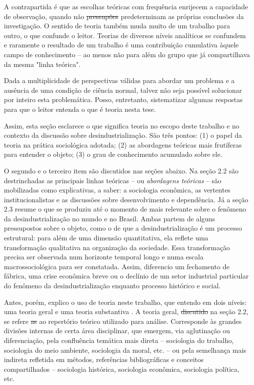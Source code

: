 A contrapartida é que as escolhas teóricas com frequência enrijecem a capacidade
de observação, quando não \sout{pressupões} predeterminam as próprias conclusões da investigação. O sentido de teoria também muda muito de um trabalho para outro, o que confunde o leitor.
Teorias de diversos níveis analíticos
se confundem e raramente o resultado de um trabalho é uma contribuição cumulativa
àquele campo de conhecimento -- ao menos não para além do grupo que já compartilhava da mesma "linha teórica".

Dada a multiplicidade de perspectivas válidas para abordar um problema
e a ausência de uma condição de ciência normal, talvez não seja possível solucionar
por inteiro esta problemática. Posso, entretanto, sistematizar algumas respostas para que o leitor entenda o que é teoria nesta tese.

Assim, esta seção esclarece o que significa teoria no escopo deste trabalho e no contexto da discussão sobre desindustrialização. São três pontos: (1) o papel da teoria na prática sociológica adotada; (2) as abordagens teóricas mais frutíferas para entender o objeto; (3) o grau de conhecimento acumulado sobre ele.

O segundo e o terceiro item são discutidos nas seções abaixo. Na seção 2.2 são
destrinchadas as principais linhas teóricas -- ou \emph{abordagens teóricas} --  são mobilizadas como explicativas, a saber:
a sociologia econômica, as vertentes institucionalistas e as discussões sobre desenvolvimento
e dependência. Já a seção 2.3 resume o que se produziu até o momento de mais relevante
sobre o fenômeno da desindustrialização no mundo e no Brasil. Ambas partem de alguns pressupostos sobre o objeto, como o de que a desindustrialização é um processo estrutural: para além de uma dimensão quantitativa, ela reflete uma transformação qualitativa na organização da sociedade. Essa transformação precisa ser observada num horizonte temporal longo e numa escala macrossociológica para ser constatada. Assim, diferencio um fechamento de fábrica, uma crise econômica breve ou o declínio de um setor industrial particular do fenômeno da desindustrialização enquanto processo histórico e social.

Antes, porém, explico o uso de teoria neste trabalho, que entendo em dois níveis: uma teoria geral e uma
teoria substantiva . A teoria geral, \sout{discutido} na seção 2.2, se refere \sout{as} ao repertório teórico utilizado para análise. Corresponde às grandes divisões internas de certa área disciplinar, que emergem, via
aglutinação ou diferenciação, pela confluência
temática mais direta -- sociologia do trabalho, sociologia do meio ambiente, sociologia da moral, etc. --
ou pela semelhança mais indireta refletida em métodos, referências bibliográficas e conceitos compartilhados -- sociologia histórica,
sociologia econômica, sociologia política, etc.

